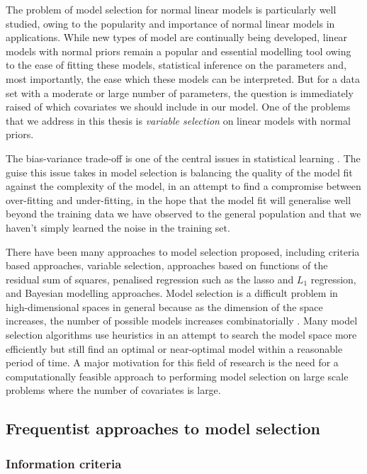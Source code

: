 The problem of model selection for normal linear models is particularly well
studied, owing to the popularity and importance of normal linear models in
applications. While new types of model are continually being developed, linear
models with normal priors remain a popular and essential modelling tool owing to
the ease of fitting these models, statistical inference on the parameters and,
most importantly, the ease which these models can be interpreted. But for a data
set with a moderate or large number of parameters, the question is immediately
raised of which covariates we should include in our model. One of the problems
that we address in this thesis is \emph{variable selection} on linear models
with normal priors.

The bias-variance trade-off is one of the central issues in statistical learning
\citep{Murphy:2012:MLP:2380985, Bishop:2006:PRM:1162264,
hastie01statisticallearning}. The guise this issue takes in model selection is
balancing the quality of the model fit against the complexity of the model, in
an attempt to find a compromise between over-fitting and under-fitting, in the
hope that the model fit will generalise well beyond the training data we have
observed to the general population and that we haven't simply learned the noise
in the training set.

There have been many approaches to model selection proposed, including criteria
based approaches, variable selection, approaches based on functions of the
residual sum of squares, penalised regression such as the lasso and $L_1$
regression, and Bayesian modelling approaches. Model selection is a difficult
problem in high-dimensional spaces in general because as the dimension of the
space increases, the number of possible models increases combinatorially
\citep{Schelldorfer2010}. Many model selection algorithms use heuristics in an
attempt to search the model space more efficiently but still find an optimal or
near-optimal model within a reasonable period of time. A major motivation for
this field of research is the need for a computationally feasible approach to
performing model selection on large scale problems where the number of
covariates is large.

\subsection{Frequentist approaches to model selection}
\subsubsection{Information criteria}

